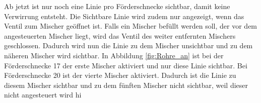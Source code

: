  \begin{figure}[H] %
\end{figure} %

Ab jetzt ist nur noch eine Linie pro Förderschnecke sichtbar, damit keine Verwirrung entsteht. Die Sichtbare Linie wird zudem nur angezeigt, wenn das Ventil zum Mischer geöffnet ist. Falls ein Mischer befüllt werden soll, der vor dem angesteuerten Mischer liegt, wird das Ventil des weiter entfernten Mischers geschlossen. Dadurch wird nun die Linie zu dem Mischer unsichtbar und zu dem näheren Mischer wird sichtbar. In Abbildung \ref{fig:Rohre_an} ist bei der Förderschnecke 17 der erste Mischer aktiviert und nur diese Linie sichtbar. Bei Förderschnecke 20 ist der vierte Mischer aktiviert. Dadurch ist die Linie zu diesem Mischer sichtbar und zu dem fünften Mischer nicht sichtbar, weil dieser nicht angesteuert wird hi

\begin{figure}[H] %
\end{figure} %

